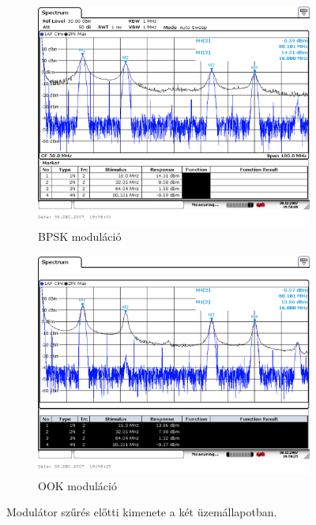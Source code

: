 \begin{figure}[H]
	\centering
	\begin{subfigure}[b]{0.49\textwidth}
		\includegraphics[width=\textwidth,keepaspectratio]{kepek/A_csop_004.PNG}
		\caption{BPSK moduláció}
		\label{fig:modulator_bpsk}
	\end{subfigure}
	\begin{subfigure}[b]{0.49\textwidth}
		\includegraphics[width=\textwidth,keepaspectratio]{kepek/A_csop_005.PNG}
		\caption{OOK moduláció}
		\label{fig:modulator_ook}
	\end{subfigure}
	\caption{Modulátor szűrés előtti kimenete a két üzemállapotban.}
	\label{fig:modulator}
\end{figure}

